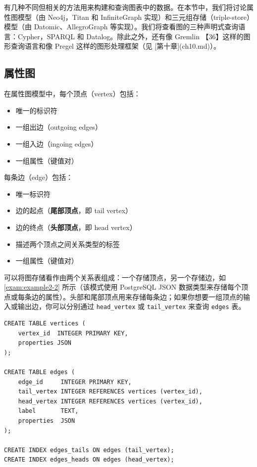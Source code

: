 有几种不同但相关的方法用来构建和查询图表中的数据。在本节中，我们将讨论属性图模型（由 Neo4j，Titan 和 InfiniteGraph 实现）和三元组存储（triple-store）模型（由 Datomic、AllegroGraph 等实现）。我们将查看图的三种声明式查询语言：Cypher，SPARQL 和 Datalog。除此之外，还有像 Gremlin 【36】这样的图形查询语言和像 Pregel 这样的图形处理框架（见 [第十章](ch10.md)）。

\subsection{属性图}

在属性图模型中，每个顶点（vertex）包括：

\begin{itemize}
    \item 唯一的标识符
    \item 一组出边（outgoing edges）
    \item 一组入边（ingoing edges）
    \item 一组属性（键值对）
\end{itemize}

每条边（edge）包括：

\begin{itemize}
    \item 唯一标识符
    \item 边的起点（\textbf{尾部顶点}，即 tail vertex）
    \item 边的终点（\textbf{头部顶点}，即 head vertex）
    \item 描述两个顶点之间关系类型的标签
    \item 一组属性（键值对）
\end{itemize}

可以将图存储看作由两个关系表组成：一个存储顶点，另一个存储边，如 \autoref{exam:example2-2} 所示（该模式使用 PostgreSQL JSON 数据类型来存储每个顶点或每条边的属性）。头部和尾部顶点用来存储每条边；如果你想要一组顶点的输入或输出边，你可以分别通过 \texttt{head\_vertex} 或 \texttt{tail\_vertex} 来查询 \texttt{edges} 表。

\label{exam:example2-2}
\begin{lstlisting}[caption={使用关系模式来表示属性图}]
CREATE TABLE vertices (
    vertex_id  INTEGER PRIMARY KEY,
    properties JSON
);

CREATE TABLE edges (
    edge_id     INTEGER PRIMARY KEY,
    tail_vertex INTEGER REFERENCES vertices (vertex_id),
    head_vertex INTEGER REFERENCES vertices (vertex_id),
    label       TEXT,
    properties  JSON
);

CREATE INDEX edges_tails ON edges (tail_vertex);
CREATE INDEX edges_heads ON edges (head_vertex);
\end{lstlisting}

